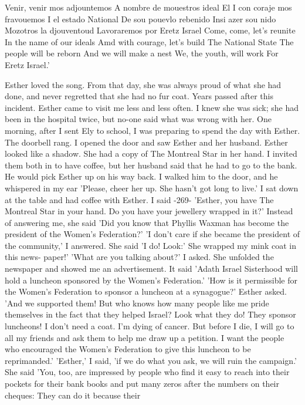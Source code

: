 Venir, venir mos adjountemos 
A nombre de mouestros ideal 
El I con coraje mos fravouemos 
I el estado National 
De sou pouevlo rebenido 
Insi azer sou nido 
Mozotros la djouventoud 
Lavoraremos por Eretz Israel 
Come, come, let's reunite 
In the name of our ideals 
Amd with courage, let's build 
The National State 
The people will be reborn 
And we will make a nest 
We, the youth, will work 
For Eretz Israel.' 

Esther loved the song. From that day, she was always proud of 
what she had done, and never regretted that she had no fur coat. 
Years passed after this incident. Esther came to visit me less 
and less often. I knew she was sick; she had been in the hospital 
twice, but no-one said what was wrong with her. One morning, after 
I sent Ely to school, I was preparing to spend the day with Esther. 
The doorbell rang. I opened the door and saw Esther and her husband. 
Esther looked like a shadow. She had a copy of The Montreal Star in 
her hand. I invited them both in to have coffee, but her husband said that he had to go to the bank. He would pick Esther up on his 
way back. I walked him to the door, and he whispered in my ear 
'Please, cheer her up. She hasn't got long to live.' 
I sat down at the table and had coffee with Esther. I said 
-269- 
'Esther, you have The Montreal Star in your hand. Do you have 
your jewellery wrapped in it?' 
Instead of answering me, she said 'Did you know that Phyllis 
Waxman has become the president of the Women's Federation?' 
'I don't care if she became the president of the community,' I 
answered. 
She said 'I do! Look:' She wrapped my mink coat in this news-
paper!' 
'What are you talking about?' I asked. 
She unfolded the newspaper and showed me an advertisement. 
It said 'Adath Israel Sisterhood will hold a luncheon sponsored by 
the Women's Federation.' 
'How is it permissible for the Women's Federation to sponsor a 
luncheon at a synagogue?' Esther asked. 'And we supported them! 
But who knows how many people like me pride themselves in the fact 
that they helped Israel? Look what they do! They sponsor luncheons! 
I don't need a coat. I'm dying of cancer. But before I die, I 
will go to all my friends and ask them to help me draw up a petition. 
I want the people who encouraged the Women's Federation to give this 
luncheon to be reprimanded.' 
'Esther,' I said, 'if we do what you ask, we will ruin the 
campaign.' 
She said 'You, too, are impressed by people who find it easy 
to reach into their pockets for their bank books and put many zeros 
after the numbers on their cheques: They can do it because their 

